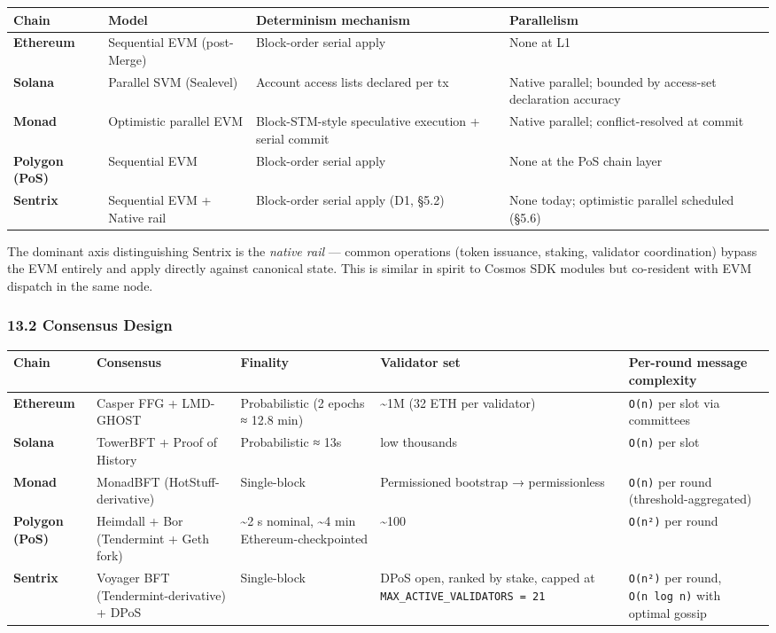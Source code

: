 \documentclass[11pt,a4paper]{article}
\begin{document}
\begin{longtable}[]{@{}llll@{}}
\toprule\noalign{}
Chain & Model & Determinism mechanism & Parallelism \\
\midrule\noalign{}
\endhead
\bottomrule\noalign{}
\endlastfoot
\textbf{Ethereum} & Sequential EVM (post-Merge) & Block-order serial
apply & None at L1 \\
\textbf{Solana} & Parallel SVM (Sealevel) & Account access lists
declared per tx & Native parallel; bounded by access-set declaration
accuracy \\
\textbf{Monad} & Optimistic parallel EVM & Block-STM-style speculative
execution + serial commit & Native parallel; conflict-resolved at
commit \\
\textbf{Polygon (PoS)} & Sequential EVM & Block-order serial apply &
None at the PoS chain layer \\
\textbf{Sentrix} & Sequential EVM + Native rail & Block-order serial
apply (D1, §5.2) & None today; optimistic parallel scheduled (§5.6) \\
\end{longtable}

The dominant axis distinguishing Sentrix is the \emph{native rail} ---
common operations (token issuance, staking, validator coordination)
bypass the EVM entirely and apply directly against canonical state. This
is similar in spirit to Cosmos SDK modules but co-resident with EVM
dispatch in the same node.

\hypertarget{132-consensus-design}{%
\subsubsection{13.2 Consensus Design}\label{132-consensus-design}}

\begin{longtable}[]{@{}lllll@{}}
\toprule\noalign{}
Chain & Consensus & Finality & Validator set & Per-round message
complexity \\
\midrule\noalign{}
\endhead
\bottomrule\noalign{}
\endlastfoot
\textbf{Ethereum} & Casper FFG + LMD-GHOST & Probabilistic (2 epochs ≈
12.8 min) & \textasciitilde1M (32 ETH per validator) & \texttt{O(n)} per
slot via committees \\
\textbf{Solana} & TowerBFT + Proof of History & Probabilistic ≈ 13s &
low thousands & \texttt{O(n)} per slot \\
\textbf{Monad} & MonadBFT (HotStuff-derivative) & Single-block &
Permissioned bootstrap → permissionless & \texttt{O(n)} per round
(threshold-aggregated) \\
\textbf{Polygon (PoS)} & Heimdall + Bor (Tendermint + Geth fork) &
\textasciitilde2 s nominal, \textasciitilde4 min Ethereum-checkpointed &
\textasciitilde100 & \texttt{O(n²)} per round \\
\textbf{Sentrix} & Voyager BFT (Tendermint-derivative) + DPoS &
Single-block & DPoS open, ranked by stake, capped at
\texttt{MAX\_ACTIVE\_VALIDATORS\ =\ 21} & \texttt{O(n²)} per round,
\texttt{O(n\ log\ n)} with optimal gossip \\
\end{longtable}
\end{document}

